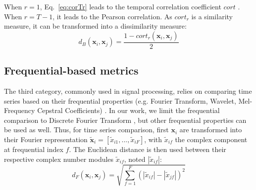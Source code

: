 When $r=1$, Eq.~\eqref{eq:corTr} leads to the temporal correlation coefficient $cort$ \cite{AhlameDouzal-Chouakria2011}. When $r=T-1$, it leads to the Pearson correlation. As $cort_r$ is a similarity measure, it can be transformed into a dissimilarity measure:
\begin{equation}
	d_B(\textbf{x}_i,\textbf{x}_j) = \frac{1 - cort_r(\textbf{x}_i,\textbf{x}_j)}{2}
	\label{eq:B}
\end{equation}



\subsection{Frequential-based metrics}
 The third category, commonly used in signal processing, relies on comparing time series based on their frequential properties (e.g. Fourier Transform, Wavelet, Mel-Frequency Cepstral Coefficients) \cite{Sahidullah2012,Torrence1998,Brigham1967}. In our work, we limit the frequential comparison to Discrete Fourier Transform \cite{Lhermitte2011a}, but other frequential properties can be used as well. Thus, for time series comparison, first $\textbf{x}_i$ are transformed into their Fourier representation $\tilde{\textbf{x}}_i=[\tilde{x}_{i1}, ...,  \tilde{x}_{iF}]$, with $\tilde{x}_{if}$ the complex component at frequential index $f$. The Euclidean distance is then used  between their respective complex number modules $\tilde{x}_{if}$, noted $|\tilde{x}_{if}|$:
\begin{equation}
d_{F}(\textbf{x}_i,\textbf{x}_j) = \sqrt{\sum_{f=1}^{F} 
	(|\tilde{x}_{if}|-|\tilde{x}_{jf}|)^2}
\label{eq:F}
\end{equation}

